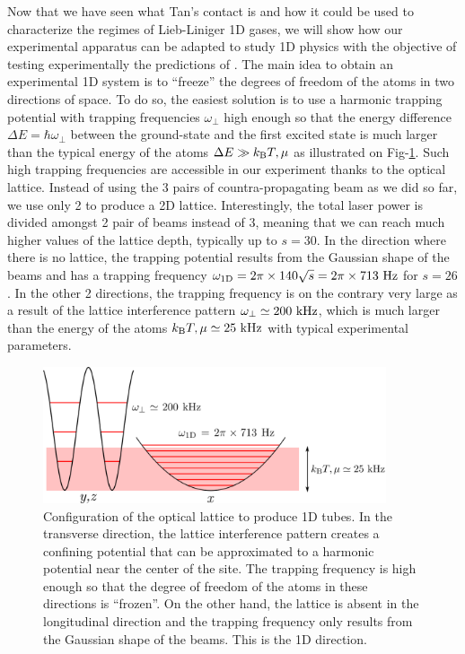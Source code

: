 Now that we have seen what Tan's contact is and how it could be used to characterize the regimes of Lieb-Liniger 1D gases, we will show how our experimental apparatus can be adapted to study 1D physics with the objective of testing experimentally the predictions of \cite{yao2018tan}. The main idea to obtain an  experimental 1D system is to ``freeze'' the degrees of freedom of the atoms in two directions of space. To do so, the easiest solution is to use a harmonic trapping potential with trapping frequencies $\omega_{\perp}$ high enough so that the energy difference $\Delta E =\hbar \omega_{\perp}$ between the ground-state and the first excited state is much larger than the typical energy of the atoms $\Delta E \gg k_{\mathrm{B}} T, \mu$ as illustrated on Fig-\ref{fig:1D_config}. Such high trapping frequencies are accessible in our experiment thanks to the optical lattice. Instead of using the 3 pairs of countra-propagating beam as we did so far, we use only 2 to produce a 2D lattice. Interestingly, the total laser power is divided amongst 2 pair of beams instead of 3, meaning that we can reach much higher values of the lattice depth, typically up to $s=30$. In the direction where there is no lattice, the trapping potential results from the Gaussian shape of the beams and has a trapping frequency $\omega_{\rm{1D}} =2 \pi \times 140 \sqrt{s} = 2 \pi  \times 713 \ \rm{Hz}$ for $s=26$. In the other 2 directions, the trapping frequency is on the contrary very large as a result of the lattice interference pattern $\omega_{\perp} \simeq 200 \ \rm{kHz}$, which is much larger than the energy of the atoms $k_{\mathrm{B}} T, \mu \simeq 25 \ \rm{kHz}$ with typical experimental parameters.

\begin{figure}
    \centering
    \includegraphics[width=0.9\textwidth]{Fig/Chapter5/1D_config.png}
    \caption{Configuration of the optical lattice to produce 1D tubes. In the transverse direction, the lattice interference pattern creates a confining potential that can be approximated to a harmonic potential near the center of the site. The trapping frequency is high enough so that the degree of freedom of the atoms in these directions is ``frozen''. On the other hand, the lattice is absent in the longitudinal direction and the trapping frequency only results from the Gaussian shape of the beams. This is the 1D direction.}
    \label{fig:1D_config}
\end{figure}


